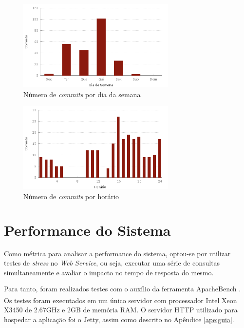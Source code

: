 \begin{figure}[!htb]
	\centering
	\includegraphics[width=0.7\textwidth]{./plots/day_of_week.png}
	\caption[Número de \emph{commits} por dia da semana]{Número de \emph{commits} por dia da semana}
	\label{fig:dayofweek}
\end{figure}

\begin{figure}[!htb]
	\centering
	\includegraphics[width=0.7\textwidth]{./plots/hour_of_day.png}
	\caption[Número de \emph{commits} por horário]{Número de \emph{commits} por horário}
	\label{fig:hourofday}
\end{figure}

\section{Performance do Sistema}

Como métrica para analisar a performance do sistema, optou-se por utilizar testes de \emph{stress} no \emph{Web Service}, ou seja, executar uma série de consultas simultaneamente e avaliar o impacto no tempo de resposta do mesmo.

Para tanto, foram realizados testes com o auxílio da ferramenta ApacheBench \cite{apachebench}.
Os testes foram executados em um único servidor com processador Intel{\textsuperscript\textregistered} Xeon{\textsuperscript\textregistered} X3450 de 2.67GHz e 2GB de memória RAM.
O servidor HTTP utilizado para hospedar a aplicação foi o Jetty, assim como descrito no Apêndice \ref{ape:guia}.

